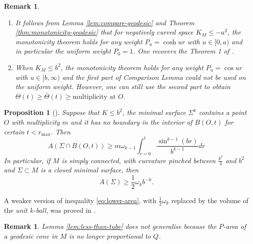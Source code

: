 \documentclass[11pt]{article}
\newtheorem{remark}[theorem]{Remark}
\newtheorem{proposition}[theorem]{Proposition}
\begin{document}
\begin{remark}
\label{rem:compare-geodesic}
\begin{enumerate}
\item It follows from Lemma \ref{lem:compare-geodesic} and Theorem \ref{thm:monotonicity-geodesic} that for negatively curved space \(K_M\leq -a^2\), the monotonicity theorem holds for
any weight \(P_u =\cosh ur\) with \(u\in [0, a)\) and in particular the uniform weight
\(P_0 = 1\). One recovers the Theorem 1 of \cite{Anderson82_CompleteMinimalVarieties}.
\item When \(K_M\leq b^2\), the monotonicity theorem holds for any weight \(P_u = \cos
   ur\) with \(u\in[b,\infty)\) and the first part of Comparison Lemma 
could not be used on the uniform weight. However, one can still use the second part to
obtain  \(\Theta(t) \geq \bar\Theta(t) \geq  \text{multiplicity at $O$}\).
\end{enumerate}
\end{remark}

\begin{proposition}[]
\label{prop:uniform-area-sphere}
Suppose that \(K\leq b^2\), the minimal surface \(\Sigma^k\) contains a point \(O\) with multiplicity \(m\) and it has no boundary in the interior of \(B(O,t)\) for
certain \(t<r_{\max}\). Then
\[
A(\Sigma\cap B(O,t)) \geq m \omega_{k-1}\int_{r=0}^{t} \frac{\sin^{k-1}(br)}{b^{k-1}}dr
\]
In particular, if \(M\) is simply connected, with curvature pinched between \(\frac{b^2}{4}\) and \(b^2\) and \(\Sigma\subset M\) is a closed minimal surface, then
\begin{equation}
\label{eq:lower-area}
 A(\Sigma)\geq \frac{1}{2}\omega_k b^{-k}. 
\end{equation}
\end{proposition}

A weaker version of inequality \eqref{eq:lower-area}, with \(\frac{1}{2}\omega_k\) replaced by
the volume of the \emph{unit \(k\)-ball}, was proved in \cite{Hoffman.Spruck74_SobolevIsoperimetricInequalities}.

\begin{remark}
\label{rem:no-less-tube}
Lemma \ref{lem:less-than-tube} does not generalise because the \(P\)-area of a
geodesic cone in \(M\) is  no longer proportional to \(Q\).
\end{remark}
\end{document}
